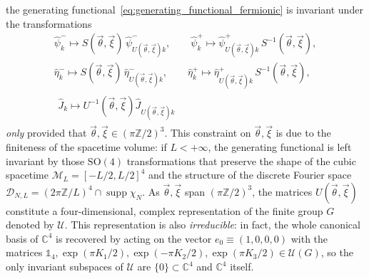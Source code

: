 \documentclass[a4paper, 11pt]{article}
\newcommand{\Z}{\mathbb{Z}}									%
\newcommand{\C}{\mathbb{C}}
\newcommand{\id}{\mathds{1}}								%
\DeclareMathOperator{\supp}{supp}							%
\theoremstyle{thm}
\begin{document}
the generating functional~\eqref{eq:generating_functional_fermionic} is invariant under the transformations
\begin{gather*}
\hat{\psi}^-_k \mapsto S(\vec{\theta}, \vec{\xi}) \, \hat{\psi}^-_{U(\vec{\theta}, \vec{\xi})k}, \qquad \hat{\psi}^+_k \mapsto \hat{\psi}^+_{U(\vec{\theta}, \vec{\xi})k} \, S^{-1}(\vec{\theta}, \vec{\xi}), \\
\hat{\eta}^-_k \mapsto S(\vec{\theta}, \vec{\xi}) \, \hat{\eta}^-_{U(\vec{\theta}, \vec{\xi})k}, \qquad \hat{\eta}^+_k \mapsto \hat{\eta}^+_{U(\vec{\theta}, \vec{\xi})k} \, S^{-1}(\vec{\theta}, \vec{\xi}), \\
\begin{split}
\hat{J}_k \mapsto U^{-1}(\vec{\theta}, \vec{\xi}) \hat{J}_{U(\vec{\theta}, \vec{\xi})k}
\end{split}
\end{gather*}
\emph{only} provided that $\vec{\theta}, \vec{\xi} \in (\pi \Z/2)^3$.  This constraint on $\vec{\theta}, \vec{\xi}$ is due to the finiteness of the spacetime volume: if $L < +\infty$, the generating functional is left invariant by those $\mathrm{SO}(4)$ transformations that preserve the shape of the cubic spacetime $\mathcal{M}_L = [-L/2, L/2]^4$ and the structure of the discrete Fourier space $\mathcal{D}_{N, L} = (2\pi \Z/L)^4 \cap \supp \chi_N$.
As $\vec{\theta}, \vec{\xi}$ span $(\pi \Z/2)^3$, the matrices $U(\vec{\theta}, \vec{\xi})$ constitute a four-dimensional, complex representation of the finite group $G$ denoted by $\mathcal{U}$. This representation is also \emph{irreducible}: in fact, the whole canonical basis of $\C^4$ is recovered by acting on the vector $e_0 \equiv (1, 0, 0, 0)$ with the matrices $\id_4, \exp(\pi K_1/2), \exp(-\pi K_2/2), \exp(\pi K_3/2) \in \mathcal{U}(G)$, so the only invariant subspaces of $\mathcal{U}$ are $\lbrace 0 \rbrace \subset \C^4$ and $\C^4$ itself.
\end{document}
